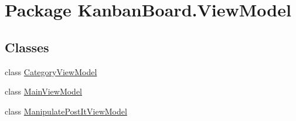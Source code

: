 \hypertarget{namespace_kanban_board_1_1_view_model}{}\section{Package Kanban\+Board.\+View\+Model}
\label{namespace_kanban_board_1_1_view_model}
\subsection*{Classes}
\begin{DoxyCompactItemize}
\item 
class \hyperlink{class_kanban_board_1_1_view_model_1_1_category_view_model}{Category\+View\+Model}
\item 
class \hyperlink{class_kanban_board_1_1_view_model_1_1_main_view_model}{Main\+View\+Model}
\item 
class \hyperlink{class_kanban_board_1_1_view_model_1_1_manipulate_post_it_view_model}{Manipulate\+Post\+It\+View\+Model}
\end{DoxyCompactItemize}
